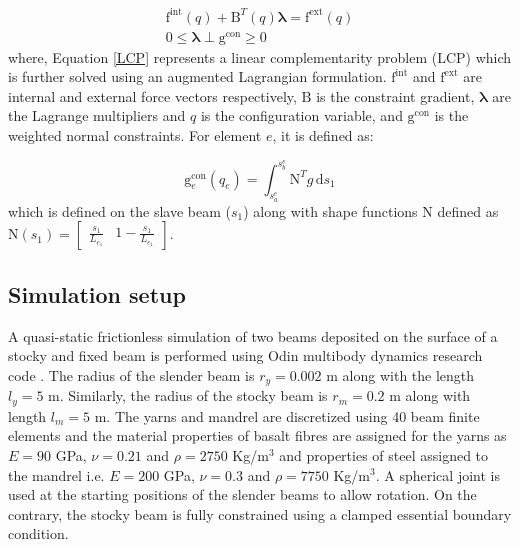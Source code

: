 \begin{subequations}
\begin{gather}
\boldsymbol{\mathrm{f}}^{\textrm{int}}(q) + \boldsymbol{\mathrm{B}}^{T}(q) \boldsymbol{\lambda} = \boldsymbol{\mathrm{f}}^{\textrm{ext}}(q)\\ \label{quasistatic}
\boldsymbol{\mathrm{0}} \leq \boldsymbol{\lambda} \perp \boldsymbol{\mathrm{g}}^{\textrm{con}} \geq \boldsymbol{\mathrm{0}} \label{LCP}
\end{gather}
\label{equilibrium}
\end{subequations}
where, Equation \ref{LCP} represents a linear complementarity problem (LCP) which is further solved using an augmented Lagrangian formulation. $\boldsymbol{\mathrm{f}}^{\textrm{int}}$ and $\boldsymbol{\mathrm{f}}^{\textrm{ext}}$ are internal and external force vectors respectively, $\boldsymbol{\mathrm{B}}$ is the constraint gradient, $\boldsymbol{\lambda}$ are the Lagrange multipliers and $q$ is the configuration variable, and $\boldsymbol{\mathrm{g}}^{\textrm{con}}$ is the weighted normal constraints. For element $e$, it is defined as: 

\begin{equation}
    \boldsymbol{\mathrm{g}}_e^{\textrm{con}}(q_e) = \int_{s^e_{a}}^{s^e_{b}} \boldsymbol{\mathrm{N}}^{T} g \, \mathrm{d}s_1
\end{equation}
which is defined on the slave beam ($s_1$) along with shape functions $\boldsymbol{\mathrm{N}}$ defined as $\boldsymbol{\mathrm{N}} (s_1) = \begin{bmatrix}
\frac{s_1}{L_{e_1}} & 1 - \frac{s_1}{L_{e_1}} 
\end{bmatrix}$. 

\subsection{Simulation setup}
A quasi-static frictionless simulation of two beams deposited on the surface of a stocky and fixed beam is performed using Odin multibody dynamics research code \cite{odin2022}. The radius of the slender beam is $r_y = 0.002$ m along with the length $l_y = 5$ m. Similarly, the radius of the stocky beam is $r_m = 0.2$ m along with length $l_m = 5$ m. The yarns and mandrel are discretized using 40 beam finite elements and the material properties of basalt fibres are assigned for the yarns as $E = 90$ GPa, $\nu = 0.21$ and $\rho = 2750$ Kg/m$^3$ and properties of steel assigned to the mandrel i.e. $E = 200$ GPa, $\nu = 0.3$ and $\rho = 7750$ Kg/m$^3$. A spherical joint is used at the starting positions of the slender beams to allow rotation. On the contrary, the stocky beam is fully constrained using a clamped essential boundary condition.\\

